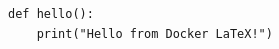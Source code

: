 \documentclass{ltjsarticle}
\begin{document}
\begin{verbatim}
def hello():
    print("Hello from Docker LaTeX!")
\end{verbatim}
\end{document}
